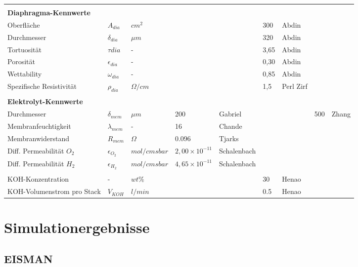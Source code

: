 \documentclass[onecolumn,10pt,titlepage]{article}
\begin{document}
\begin{table}[]
\begin{tabular*}{\textwidth}{lllllllll}
		&&&&&&&& \\
		\textbf{Diaphragma-Kennwerte}&&&&&&&& \\
		Oberfläche 								& $A_{dia}$ 			& $cm^{2}$ 			&&& 300 	& Abdin		&&\\
		Durchmesser 							& $\delta_{dia}$ 		& $\mu{m}$ 			&&& 320 	& Abdin		&&\\
		Tortuosität 							& $\tau{dia}$			& - 				&&& 3,65 	& Abdin		&&\\
		Porosität 								& $\epsilon_{dia}$ 		& - 				&&& 0,30 	& Abdin		&&\\
		Wettability 							& $\omega_{dia}$ 		& - 				&&& 0,85 	& Abdin		&&\\
		Spezifische Resistivität 				& $\rho_{dia}$ 			& ${\Omega}/cm$ 	&&& 1,5 	& Perl Zirf &&\\

		&&&&&&&& \\
		\textbf{Elektrolyt-Kennwerte}&&&&&&&& \\
		Durchmesser								& $\delta_{mem}$		& $\mu{m}$			& 200		& Gabriel	&			&			& 500   & Zhang \\
		Membranfeuchtigkeit						& $\lambda_{mem}$		& -					& 16  		& Chande	& 			& 			& 		& 		\\
		Membranwiderstand						& $R_{mem}$ 			& $\Omega$			& 0.096		& Tjarks	& 	 		& 			& 	 	& 		\\
		Diff. Permeabilität $O_{2}$				& $\epsilon_{O_{2}}$	& $mol/cmsbar$		& $2,00\times{10^{-11}}$	& Schalenbach			&			&						&	 \\
		Diff. Permeabilität $H_{2}$				& $\epsilon_{H_{2}}$	& $mol/cmsbar$		& $4,65\times{10^{-11}}$	& Schalenbach			&			&						&	 \\

		&&&&&&&& \\
		KOH-Konzentration 						& - 					& $wt\%$ 			&			&			& 30 		& Henao		&		& 		\\
		KOH-Volumenstrom pro Stack 				& $V_{KOH}$ 			& $l/min$ 			&			&			& 0.5 		& Henao		&		& 		\\




	\end{tabular*}
\end{table}
\section{Simulationergebnisse}
\subsection{EISMAN}
\end{document}
